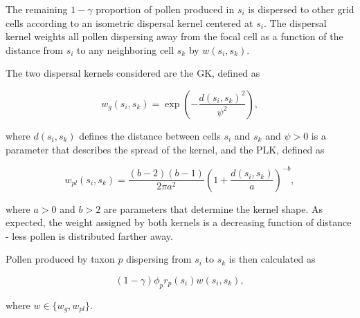 \documentclass[12pt]{article}
\begin{document}
The remaining $1-\gamma$ proportion of pollen produced in $s_i$ is
dispersed to other grid cells according to an isometric dispersal
kernel centered at $s_i$. The dispersal kernel weights all pollen
dispersing away from the focal cell as a function of the distance from
$s_i$ to any neighboring cell $s_k$ by $w(s_i, s_k)$.

The two dispersal kernels considered are the GK, defined as
\begin{linenomath*}
\begin{equation}
  w_g(s_i, s_k) = \exp\left( - \frac{d(s_i, s_k)^2}{\psi^2} \right),
\end{equation}
\end{linenomath*}
where $d(s_i,s_k)$ defines the distance between cells $s_i$ and $s_k$
and $\psi>0$ is a parameter that describes the spread of the
kernel, and the PLK, defined as
\begin{linenomath*}
\begin{equation}
w_{pl}(s_i, s_k) = \frac{(b-2)(b-1)}{2 \pi a^2} \left( 1 + \frac{d(s_i, s_k)}{a} \right)^{-b},
\end{equation}
\end{linenomath*}
where $a>0$ and $b>2$ are parameters that determine the kernel
shape. As expected, the weight assigned by both kernels is a
decreasing function of distance - less pollen is distributed farther
away.
 
Pollen produced by taxon $p$ dispersing from $s_i$ to $s_k$ is then
calculated as
\begin{linenomath*}
\begin{equation}
(1-\gamma) \phi_p r_p(s_i) w(s_i, s_k),
\end{equation}
\end{linenomath*}
where $w \in \{w_{g}, w_{pl} \}$.
\end{document}
